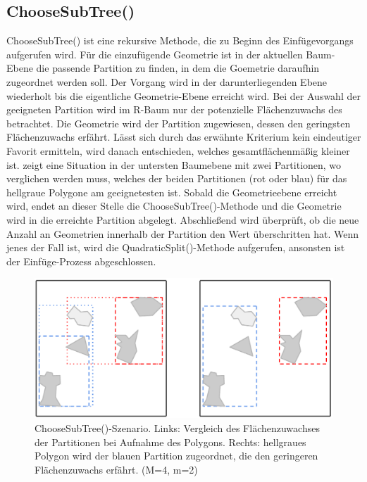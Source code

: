 \documentclass[runningheads,a4paper]{llncs}
\begin{document}
\subsection{ChooseSubTree()}
\label{sec:r-choose-sub}
ChooseSubTree() ist eine rekursive Methode, die zu Beginn des Einfügevorgangs aufgerufen wird. Für die einzufügende Geometrie ist in der aktuellen Baum-Ebene die passende Partition zu finden, in dem die Goemetrie daraufhin zugeordnet werden soll. Der Vorgang wird in der darunterliegenden Ebene wiederholt bis die eigentliche Geometrie-Ebene erreicht wird. Bei der Auswahl der geeigneten Partition wird im R-Baum nur der potenzielle Flächenzuwachs des  betrachtet. Die Geometrie wird der Partition zugewiesen, dessen  den geringsten Flächenzuwachs erfährt. Lässt sich durch das erwähnte Kriterium kein eindeutiger Favorit ermitteln, wird danach entschieden, welches  gesamtflächenmäßig kleiner ist.  zeigt eine Situation in der untersten Baumebene mit zwei Partitionen, wo verglichen werden muss, welches der beiden Partitionen (rot oder blau) für das hellgraue Polygone am geeignetesten ist. Sobald die Geometrieebene erreicht wird, endet an dieser Stelle die ChooseSubTree()-Methode und die Geometrie wird in die erreichte Partition abgelegt. Abschließend wird überprüft, ob die neue Anzahl an Geometrien innerhalb der Partition den Wert  überschritten hat. Wenn jenes der Fall ist, wird die QuadraticSplit()-Methode aufgerufen, ansonsten ist der Einfüge-Prozess abgeschlossen.
\begin{figure}[H]
		\begin{center}
		\includegraphics[width=1.0\textwidth ]{002_Beispiel_Choose_SubTree.pdf}
		\caption{ChooseSubTree()-Szenario. Links: Vergleich des Flächenzuwachses der Partitionen bei Aufnahme des Polygons. Rechts: hellgraues Polygon wird der blauen Partition zugeordnet, die den geringeren Flächenzuwachs erfährt. (\acs{M}=4, \acs{m}=2)}
		\label{fig:beispiel-choose-subtree}
		\end{center}
	\end{figure}
\end{document}
